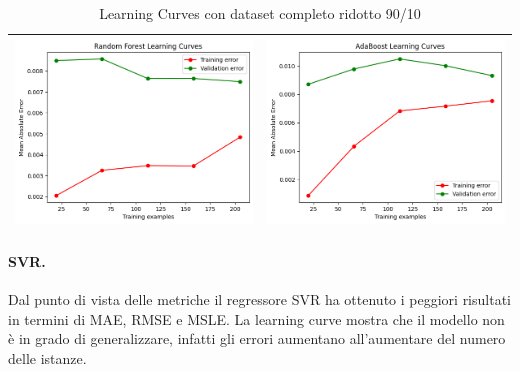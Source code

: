 \begin{table}[H]
\begin{tabularx}{\textwidth}{|X|X|}
        \includegraphics[width=\linewidth, trim=0 0 0 0]{images/RandomForest_lc90_ridotto.png} &
        \includegraphics[width=\linewidth, trim=0 0 0 0]{images/AdaBoost_lc90_ridotto.png} \\
        \hline
    \end{tabularx}
    \caption{Learning Curves con dataset completo ridotto 90/10}
    \label{tab:emissions_info}
\end{table}

\paragraph{\textbf{SVR}.}
Dal punto di vista delle metriche il regressore SVR ha ottenuto i peggiori risultati in termini di MAE, RMSE e MSLE. La learning curve mostra che il modello non è in grado di generalizzare, infatti gli errori aumentano all'aumentare del numero delle istanze.


